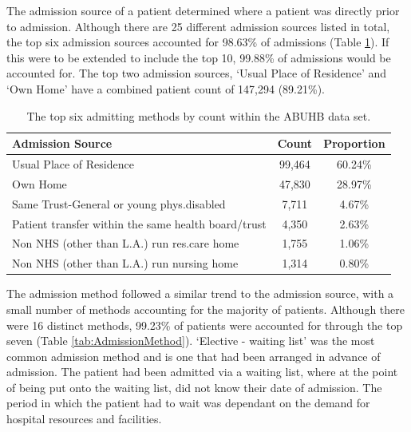 \documentclass[../thesis.tex]{subfiles}
\begin{document}
The admission source of a patient determined where a patient was directly prior to admission. Although there are 25 different admission sources listed in total, the top six admission sources accounted for 98.63\% of admissions (Table \ref{tab:AdmissionSource}). If this were to be extended to include the top 10, 99.88\% of admissions would be accounted for. The top two admission sources, `Usual Place of Residence' and `Own Home' have a combined patient count of 147,294 (89.21\%).

\begin{table}[h!]
    \centering
    \begin{tabular}{lcc}\toprule
    \textbf{Admission Source} & \textbf{Count} &\textbf{Proportion} \\ \midrule
    Usual Place of Residence &	99,464 & 60.24\% \\
Own Home&	47,830 & 28.97\%\\
Same Trust-General or young phys.disabled&	7,711 &4.67\%\\
Patient transfer within the same health board/trust	&4,350 &2.63\%\\
Non NHS (other than L.A.) run res.care home&	1,755 &1.06\%\\
Non NHS (other than L.A.) run nursing home&	1,314 &0.80\%\\
 \bottomrule
    \end{tabular}
    \caption{The top six admitting methods by count within the ABUHB data set.}
    \label{tab:AdmissionSource}
\end{table}


The admission method followed a similar trend to the admission source, with a small number of methods accounting for the majority of patients. Although there were 16 distinct methods, 99.23\% of patients were accounted for through the top seven (Table \ref{tab:AdmissionMethod}). `Elective - waiting list' was the most common admission method and is one that had been arranged in advance of admission. The patient had been admitted via a waiting list, where at the point of being put onto the waiting list, did not know their date of admission. The period in which the patient had to wait was dependant on the demand for hospital resources and facilities.
\end{document}
